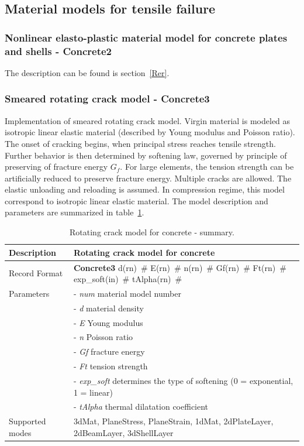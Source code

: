 \documentclass[a4paper]{article}
\newcommand{\descitem}[1]{{\noindent \bf #1}}
\newcommand{\elemparam}[2]{{{#1\tiny (#2)}~\#}}
\newcommand{\param}[1]{{\it #1}}
\begin{document}
\subsection{Material models for tensile failure}
\subsubsection{Nonlinear elasto-plastic material model for concrete
plates and shells - Concrete2}
The description can be found is section~\ref{Rer}.



\subsubsection{Smeared rotating crack model - Concrete3}
\label{rcm}
Implementation of smeared rotating crack model.
Virgin material is modeled as isotropic linear elastic material
(described by Young modulus and Poisson
ratio). The onset of cracking begins, when principal stress reaches
tensile strength.
Further behavior is then determined by softening law,
governed by principle of preserving of fracture
energy $G_f$. For large elements, the tension strength can be
artificially reduced
to preserve fracture energy. Multiple cracks are allowed.
The elastic unloading and reloading is assumed.
In compression regime, this model correspond to isotropic linear elastic material.
The model description and parameters are summarized
in table~\ref{rcm_table}.

\begin{table}[!htb]
\begin{tabular}{|l|p{9cm}|}
\hline
Description & Rotating crack model for concrete\\
\hline
Record Format & \descitem{Concrete3} \elemparam{d}{rn} \elemparam{E}{rn}
\elemparam{n}{rn} \elemparam{Gf}{rn} \elemparam{Ft}{rn} \elemparam{exp\_soft}{in} \elemparam{tAlpha}{rn} \\
Parameters &- \param{num} material model number\\
&- \param{d} material density\\
&- \param{E} Young modulus\\
&- \param{n} Poisson ratio\\
&- \param{Gf} fracture energy\\
&- \param{Ft} tension strength\\
&- \param{exp\_soft} determines the type of softening (0 =
exponential, 1 = linear)\\
&- \param{tAlpha} thermal dilatation coefficient\\
Supported modes& 3dMat, PlaneStress, PlaneStrain, 1dMat,
2dPlateLayer, 2dBeamLayer, 3dShellLayer\\
\hline
\end{tabular}
\caption{Rotating crack model for concrete - summary.}
\label{rcm_table}
\end{table}
\end{document}
